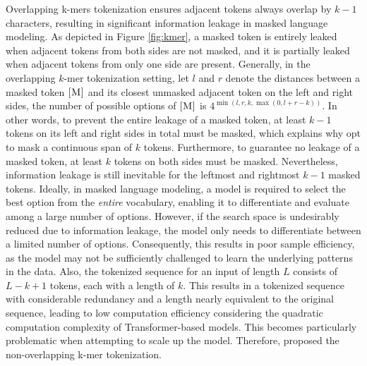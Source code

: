 \documentclass{article}
\begin{document}
Overlapping k-mers tokenization ensures adjacent tokens always overlap by $k-1$ characters, resulting in significant information leakage in masked language modeling. 
As depicted in Figure \ref{fig:kmer}, a masked token is entirely leaked when adjacent tokens from both sides are not masked, and it is partially leaked when adjacent tokens from only one side are present.
Generally, in the overlapping $k$-mer tokenization setting, let $l$ and $r$ denote the distances between a masked token $\textsc{[M]}$ and its closest unmasked adjacent token on the left and right sides, the number of possible options of $\textsc{[M]}$ is $4^{\min(l, r, k, \max(0, l + r - k))}$. 
In other words, to prevent the entire leakage of a masked token, at least $k-1$ tokens on its left and right sides in total must be masked, which explains why \citet{dnabert} opt to mask a continuous span of $k$ tokens. 
Furthermore, to guarantee no leakage of a masked token, at least $k$ tokens on both sides must be masked. 
Nevertheless, information leakage is still inevitable for the leftmost and rightmost $k-1$ masked tokens. 
Ideally, in masked language modeling, a model is required to select the best option from the \textit{entire} vocabulary, enabling it to differentiate and evaluate among a large number of options. However, if the search space is undesirably reduced due to information leakage, the model only needs to differentiate between a limited number of options. Consequently, this results in poor sample efficiency, as the model may not be sufficiently challenged to learn the underlying patterns in the data. Also, the tokenized sequence for an input of length $L$ consists of $L-k+1$ tokens, each with a length of $k$. This results in a tokenized sequence with considerable redundancy and a length nearly equivalent to the original sequence, leading to low computation efficiency considering the quadratic computation complexity of Transformer-based \citep{transformer} models.
This becomes particularly problematic when attempting to scale up the model. Therefore, \citet{nt} proposed the non-overlapping k-mer tokenization.
\end{document}
